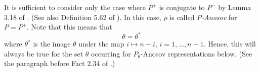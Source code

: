 It is sufficient to consider only the case where $P^{+}$ is conjugate to $P^{-}$
by Lemma 3.18 of \cite{GW12}. (See also Definition 5.62 of \cite{KLP17}). 
In this case, $\rho$ is called {\em $P$-Anosov} for $P = P^+$. 
Note that this means that 
\begin{equation}  \label{eqn:theta*} 
\theta = \theta^*
\end{equation} 
where $\theta^*$ is the image $\theta$ under the map $i \mapsto n-i$, $i=1, \dots, n-1$.
Hence, this will always be true for the set $\theta$ occurring for $P_\theta$-Anosov 
representations below.
(See the paragraph before Fact 2.34 of \cite{GGKW17ii}.)







